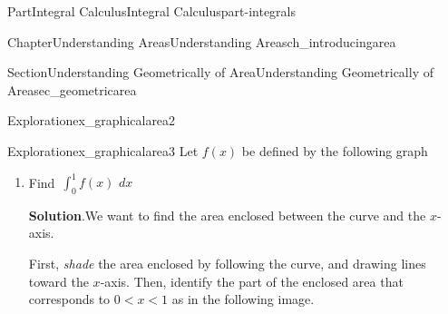 \documentclass{tufte-book}
\newcommand{\blocktitlefont}{\relax}
\numberwithin{equation}{chapter}
\newcommand{\intdx}[1]{{\,\int#1\,\,dx}}
\newcommand{\lt}{<}
\begin{document}
\begin{partptx}{Part}{Integral Calculus}{}{Integral Calculus}{}{}{part-integrals}
\begin{chapterptx}{Chapter}{Understanding Areas}{}{Understanding Areas}{}{}{ch_introducingarea}
\begin{sectionptx}{Section}{Understanding Geometrically of Area}{}{Understanding Geometrically of Area}{}{}{sec_geometricarea}
\begin{exploration}{Exploration}{}{ex_graphicalarea2}
\begin{enumerate}[font=\bfseries,label=(\alph*),ref=\alph*]
%
\end{enumerate}%
\end{exploration}%
\begin{exploration}{Exploration}{}{ex_graphicalarea3}%
Let \(f(x)\) be defined by the following graph%
\begin{image}{0.25}{0.5}{0.25}{}%
%
\end{image}%
\begin{enumerate}[font=\bfseries,label=(\alph*),ref=\alph*]%
\item{}Find \(\intdx{_0^1 f(x) }\)%
\par\smallskip%
\noindent\textbf{\blocktitlefont Solution}.\hypertarget{ex_graphicalarea3-2-2}{}\quad{}We want to find the area enclosed between the curve and the \(x\)-axis.%
\par
First, \emph{shade} the area enclosed by following the curve, and drawing lines toward the \(x\)-axis. Then, identify the part of the enclosed area that corresponds to \(0\lt x \lt 1\) as in the following image.%
\begin{image}{0.25}{0.5}{0.25}{}%
\end{image}
\end{enumerate}
\end{exploration}
\end{sectionptx}
\end{chapterptx}
\end{partptx}
\end{document}
